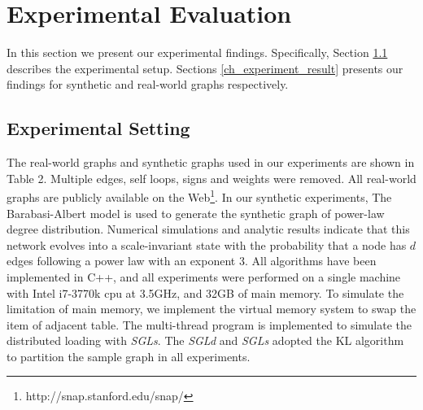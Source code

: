\documentclass{sig-alternate-2013}
\begin{document}
\section{Experimental Evaluation}
In this section we present our experimental findings. Specifically, Section \ref{ch_experiment_setup} describes the experimental setup.
Sections \ref{ch_experiment_result} presents our findings for synthetic and real-world graphs respectively.
\subsection{Experimental Setting}\label{ch_experiment_setup}

The real-world graphs and synthetic graphs used in our experiments are shown in Table 2.
Multiple edges, self loops, signs and weights were removed.
All real-world graphs are publicly available on the Web\footnote{http://snap.stanford.edu/snap/}.
In our synthetic experiments, The Barabasi-Albert model\cite{BA:randomgraph} is used to generate the synthetic graph of power-law degree distribution.
Numerical simulations and analytic results indicate that this network evolves into a scale-invariant state with the probability that a node has $d$ edges following a power law with an exponent 3.
All algorithms have been implemented in C++, and all experiments were performed on a single machine with Intel i7-3770k cpu at 3.5GHz, and 32GB of main memory.
To simulate the limitation of main memory, we implement the virtual memory system to swap the item of adjacent table.
The multi-thread program is implemented to simulate the distributed loading with \textit{SGLs}. The \textit{SGLd} and \textit{SGLs} adopted the KL algorithm to partition the sample graph in all experiments.
\end{document}
